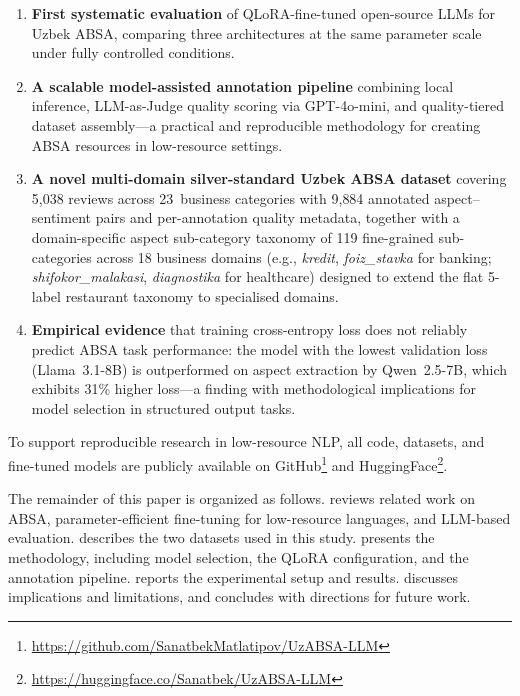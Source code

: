 \documentclass[computers,article,submit,pdftex,moreauthors]{Definitions/mdpi}
\begin{document}
\begin{enumerate}
\item \textbf{First systematic evaluation} of QLoRA-fine-tuned open-source LLMs for Uzbek ABSA, comparing three architectures at the same parameter scale under fully controlled conditions.

\item \textbf{A scalable model-assisted annotation pipeline} combining local inference, LLM-as-Judge quality scoring via GPT-4o-mini, and quality-tiered dataset assembly---a practical and reproducible methodology for creating ABSA resources in low-resource settings.

\item \textbf{A novel multi-domain silver-standard Uzbek ABSA dataset} covering 5{,}038 reviews across 23~business categories with 9{,}884 annotated aspect--sentiment pairs and per-annotation quality metadata, together with a domain-specific aspect sub-category taxonomy of 119 fine-grained sub-categories across 18 business domains (e.g., \textit{kredit}, \textit{foiz\_stavka} for banking; \textit{shifokor\_malakasi}, \textit{diagnostika} for healthcare) designed to extend the flat 5-label restaurant taxonomy to specialised domains.

\item \textbf{Empirical evidence} that training cross-entropy loss does not reliably predict ABSA task performance: the model with the lowest validation loss (Llama~3.1-8B) is outperformed on aspect extraction by Qwen~2.5-7B, which exhibits 31\% higher loss---a finding with methodological implications for model selection in structured output tasks.
\end{enumerate}
 To support reproducible research in low-resource NLP, all code, datasets, and fine-tuned models are publicly available on GitHub\footnote{\url{https://github.com/SanatbekMatlatipov/UzABSA-LLM}} and HuggingFace\footnote{\url{https://huggingface.co/Sanatbek/UzABSA-LLM}}.


The remainder of this paper is organized as follows.  reviews related work on ABSA, parameter-efficient fine-tuning for low-resource languages, and LLM-based evaluation.  describes the two datasets used in this study.  presents the methodology, including model selection, the QLoRA configuration, and the annotation pipeline.  reports the experimental setup and results.  discusses implications and limitations, and  concludes with directions for future work.
\end{document}
